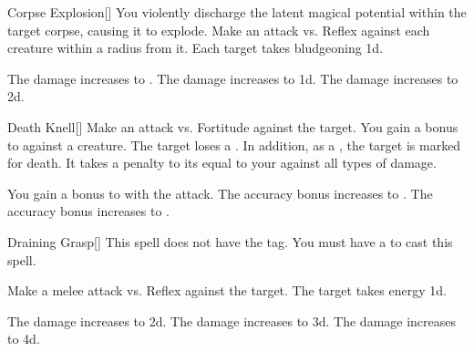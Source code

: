 \lowercase{\hypertarget{spell:Corpse Explosion}{}}\label{spell:Corpse Explosion}
\begin{freeability}[Rank 2]{\hypertarget{spell:Corpse Explosion}{Corpse Explosion}}[]
You violently discharge the latent magical potential within the target corpse, causing it to explode.
Make an attack vs. Reflex against each creature within a \areasmall radius from it.
\hit Each target takes bludgeoning  \minus1d.

\rankline
{} The damage increases to .
 The damage increases to  \plus1d.
 The damage increases to  \plus2d.

\end{freeability}
\vspace{0.25em}



\lowercase{\hypertarget{spell:Death Knell}{}}\label{spell:Death Knell}
\begin{freeability}[Rank 2]{\hypertarget{spell:Death Knell}{Death Knell}}[]
Make an attack vs. Fortitude against the target.
You gain a  bonus to  against a  creature.
\hit The target loses a .
In addition, as a , the target is marked for death.
It takes a penalty to its  equal to your  against all types of damage.

\rankline
{} You gain a  bonus to  with the attack.
 The accuracy bonus increases to .
 The accuracy bonus increases to .

\end{freeability}
\vspace{0.25em}



\lowercase{\hypertarget{spell:Draining Grasp}{}}\label{spell:Draining Grasp}
\begin{freeability}[Rank 2]{\hypertarget{spell:Draining Grasp}{Draining Grasp}}[]
This spell does not have the  tag.
You must have a  to cast this spell.

Make a melee attack vs. Reflex against the target.
\hit The target takes energy  \plus1d.

\rankline
{} The damage increases to  \plus2d.
 The damage increases to  \plus3d.
 The damage increases to  \plus4d.

\end{freeability}
\vspace{0.25em}



